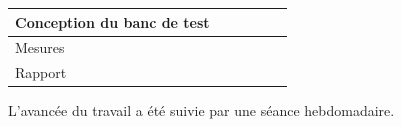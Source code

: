 \begin{table}[H]
\begin{tabular}{lllllllll}
        \multicolumn{1}{|l|}{Conception du banc de test}                                                          & \multicolumn{1}{l|}{}                                                         & \multicolumn{3}{l|}{}                                                         & \multicolumn{1}{l|}{}                                                         & \multicolumn{2}{l|}{\cellcolor[HTML]{9AFF99}}                                 & \multicolumn{1}{l|}{}                                                                                      \\ \hline
        \multicolumn{1}{|l|}{Mesures}                                                                             & \multicolumn{1}{l|}{}                                                         & \multicolumn{3}{l|}{}                                                         & \multicolumn{1}{l|}{}                                                         & \multicolumn{1}{l|}{}                                                         & \multicolumn{2}{l|}{\cellcolor[HTML]{9AFF99}}                                                              \\ \hline
        \multicolumn{1}{|l|}{Rapport}                                                                             & \multicolumn{8}{l|}{\cellcolor[HTML]{D3FDD3}}                                                                                                                                                                                                                                                                                                                                                                                              \\ \hline
    \end{tabular}
\end{table}

L'avancée du travail a été suivie par une séance hebdomadaire. 

